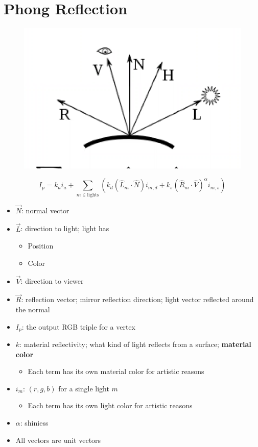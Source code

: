 \section{Phong Reflection}

\begin{figure}[H]
  \centering
  \includegraphics[width=0.7\columnwidth]{images/shading/phong.png}
\end{figure}

\begin{equation}
  I_{p} = k_{a} i_{a} +
  \sum_{m \in \text{lights}}
  \left(
    k_{d} \left( \hat{L}_{m} \cdot \hat{N} \right) i_{m, d} +
    k_{s} \left( \hat{R}_{m} \cdot \hat{V} \right)^{\alpha} i_{m, s}
  \right)
\end{equation}

\begin{itemize}
  \item $ \vec{N} $: normal vector
  \item $ \vec{L} $: direction to light; light has
  \begin{itemize}
    \item Position
    \item Color
  \end{itemize}
  \item $ \vec{V} $: direction to viewer
  \item $ \vec{R} $: reflection vector; mirror reflection direction; light
  vector reflected around the normal
  \item $ I_{p} $: the output RGB triple for a vertex
  \item $ k $: material reflectivity; what kind of light reflects from a
  surface; \textbf{material color}
  \begin{itemize}
    \item Each term has its own material color for artistic reasons
  \end{itemize}

  \item $ i_{m} $: $ \left( r, g, b \right) $ for a single light $ m $
  \begin{itemize}
    \item Each term has its own light color for artistic reasons
  \end{itemize}

  \item $ \alpha $: shiniess

  \item All vectors are unit vectors
\end{itemize}

